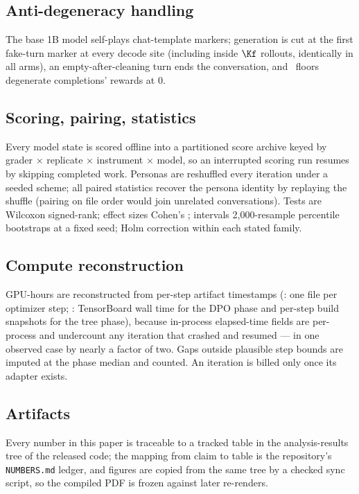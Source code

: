 \subsection{Anti-degeneracy handling}

The base 1B model self-plays chat-template markers; generation is cut at the first fake-turn
marker at every decode site (including inside $\Kf$ rollouts, identically in all arms), an
empty-after-cleaning turn ends the conversation, and \GRPO\ floors degenerate completions'
rewards at 0.

\subsection{Scoring, pairing, statistics}

Every model state is scored offline into a partitioned score archive keyed by grader $\times$
replicate $\times$ instrument $\times$ model, so an interrupted scoring run resumes by skipping
completed work. Personas are reshuffled every iteration under a seeded scheme; all paired
statistics recover the persona identity by replaying the shuffle (pairing on file order would
join unrelated conversations). Tests are Wilcoxon signed-rank; effect sizes Cohen's \dz;
intervals 2{,}000-resample percentile bootstraps at a fixed seed; Holm correction within each
stated family.

\subsection{Compute reconstruction}

GPU-hours are reconstructed from per-step artifact timestamps (\GRPO: one file per optimizer
step; \PTO: TensorBoard wall time for the DPO phase and per-step build snapshots for the tree
phase), because in-process elapsed-time fields are per-process and undercount any iteration that
crashed and resumed --- in one observed case by nearly a factor of two. Gaps outside plausible
step bounds are imputed at the phase median and counted. An iteration is billed only once its
adapter exists.

\subsection{Artifacts}

Every number in this paper is traceable to a tracked table in the analysis-results tree of the
released code; the mapping from claim to table is the repository's \texttt{NUMBERS.md} ledger,
and figures are copied from the same tree by a checked sync script, so the compiled PDF is
frozen against later re-renders.
